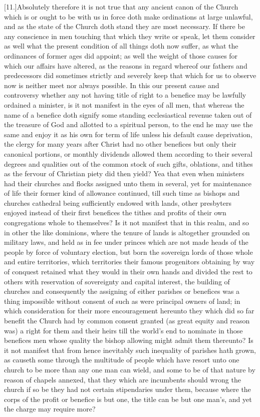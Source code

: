[11.]Absolutely therefore it is not true that any ancient canon of the Church which is or ought to be with us in force doth make ordinations at large unlawful, and as the state of the Church doth stand they are most necessary. If there be any conscience in men touching that which they write or speak, let them consider as well what the present condition of all things doth now suffer, as what the ordinances of former ages did appoint; as well the weight of those causes for which our affairs have altered, as the reasons in regard whereof our fathers and predecessors did sometimes strictly and severely keep that which for us to observe now is neither meet nor always possible. In this our present cause and controversy whether any not having title of right to a benefice may be lawfully ordained a minister, is it not manifest in the eyes of all men, that whereas the name of a benefice doth signify some standing ecclesiastical revenue taken out of the treasure of God and allotted to a spiritual person, to the end he may use the same and enjoy it as his own for term of life unless  his default cause deprivation, the clergy for many years after Christ had no other benefices but only their canonical portions, or monthly dividends allowed them according to their several degrees and qualities out of the common stock of such gifts, oblations, and tithes as the fervour of Christian piety did then yield? Yea that even when ministers had their churches and flocks assigned unto them in several, yet for maintenance of life their former kind of allowance continued, till such time as bishops and churches cathedral being sufficiently endowed with lands, other presbyters enjoyed instead of their first benefices the tithes and profits of their own congregations whole to themselves? Is it not manifest that in this realm, and so in other the like dominions, where the tenure of lands is altogether grounded on military laws, and held as in fee under princes which are not made heads of the people by force of voluntary election, but born the sovereign lords of those whole and entire territories, which territories their famous progenitors obtaining by way of conquest retained what they would in their own hands and divided the rest to others with reservation of sovereignty and capital interest, the building of churches and consequently the assigning of either parishes or benefices was a thing impossible without consent of such as were principal owners of land; in which consideration for their more encouragement hereunto they which did so far benefit the Church had by common consent granted (as great equity and reason was) a right for them and their heirs till the world’s end to nominate in those benefices men whose  quality the bishop allowing might admit them thereunto?
 Is it not manifest that from hence inevitably such inequality of parishes hath grown, as causeth some through the multitude of people which have resort unto one church to be more than any one man can wield, and some to be of that nature by reason of chapels annexed, that they which are incumbents should wrong the church if so be they had not certain stipendaries under them, because where the corps of the profit or benefice is but one, the title can be but one man’s, and yet the charge may require more?

